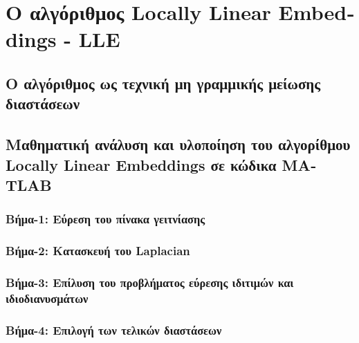 

\chapter{Ο αλγόριθμος \textlatin{Locally Linear Embeddings - LLE}}

\section{Ο αλγόριθμος ως τεχνική μη γραμμικής μείωσης διαστάσεων}

\section{Μαθηματική ανάλυση και υλοποίηση του αλγορίθμου \textlatin{Locally Linear Embeddings} σε κώδικα \textlatin{MATLAB}}
\subsection{Βήμα-1: Εύρεση του πίνακα γειτνίασης}

\subsection{Βήμα-2: Κατασκευή του \textlatin{Laplacian}}

\subsection{Βήμα-3: Επίλυση του προβλήματος εύρεσης ιδιτιμών και ιδιοδιανυσμάτων}

\subsection{Βήμα-4: Επιλογή των τελικών διαστάσεων}

